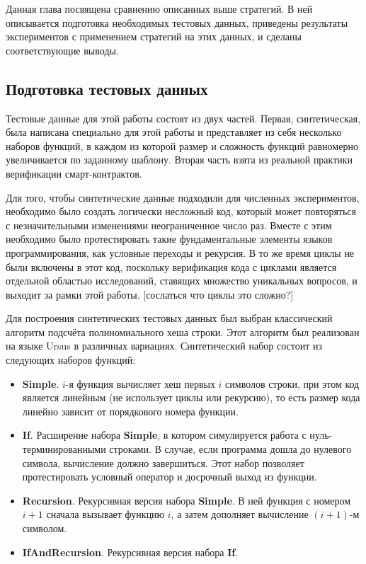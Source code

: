 \documentclass[../diploma.tex]{subfiles}
\begin{document}
\label{sec:3}

Данная глава посвящена сравнению описанных выше стратегий. В ней описывается подготовка необходимых тестовых данных, приведены результаты экспериментов с применением стратегий на этих данных, и сделаны соответствующие выводы.

\subsection{Подготовка тестовых данных}

Тестовые данные для этой работы состоят из двух частей. Первая, синтетическая, была написана специально для этой работы и представляет из себя несколько наборов функций, в каждом из которой размер и сложность функций равномерно увеличивается по заданному шаблону. Вторая часть взята из реальной практики верификации смарт-контрактов.

Для того, чтобы синтетические данные подходили для численных экспериментов, необходимо было создать логически несложный код, который может повторяться с незначительными изменениями неограниченное число раз. Вместе с этим необходимо было протестировать такие фундаментальные элементы языков программирования, как условные переходы и рекурсия. В то же время циклы не были включены в этот код, поскольку верификация кода с циклами является отдельной областью исследований, ставящих множество уникальных вопросов, и выходит за рамки этой работы. [сослаться что циклы это сложно?]

Для построения синтетических тестовых данных был выбран классический алгоритм подсчёта полиномиального хеша строки. Этот алгоритм был реализован на языке Ursus в различных вариациях. Синтетический набор состоит из следующих наборов функций:

\begin{itemize}
    \item \textbf{Simple}. $i$-я функция вычисляет хеш первых $i$ символов строки, при этом код является линейным (не использует циклы или рекурсию), то есть размер кода линейно зависит от порядкового номера функции.
    \item \textbf{If}. Расширение набора \textbf{Simple}, в котором симулируется работа с нуль-\\ терминированными строками. В случае, если программа дошла до нулевого символа, вычисление должно завершиться. Этот набор позволяет протестировать условный оператор и досрочный выход из функции.
    \item \textbf{Recursion}. Рекурсивная версия набора \textbf{Simple}. В ней функция с номером $i+1$ сначала вызывает функцию $i$, а затем дополняет вычисление $(i+1)$-м символом.
    \item \textbf{IfAndRecursion}. Рекурсивная версия набора \textbf{If}.
\end{itemize}
\end{document}
